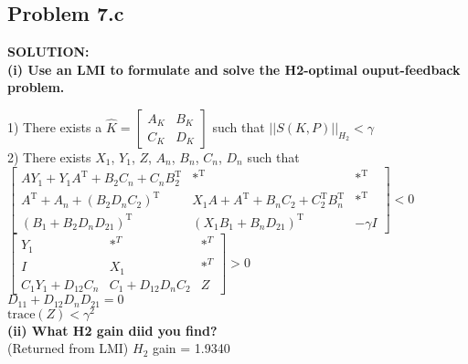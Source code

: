 \documentclass[10pt,a4paper]{article}
\begin{document}
\subsection{Problem 7.c}
\begin{tcolorbox}
\textbf{SOLUTION:}\\
\textbf{(i) Use an LMI to formulate and solve the H2-optimal ouput-feedback problem.} 

1) There exists a $\hat{K}=\begin{bmatrix} A_K & B_K \\ C_K & D_K \end{bmatrix}$ such that $||S(K,P)||_{H_2}<\gamma$\\

2) There exists $X_1$, $Y_1$, $Z$, $A_n$, $B_n$, $C_n$, $D_n$ such that\\

$\begin{bmatrix} 
AY_{1}+Y_{1}A^{\text{T}}+B_{2}C_{n}+C_{n}B_{2}^{\text{T}}  & *^{\text{T}} & *^{\text{T}} \\ 
A^{\text{T}}+A_{n}+(B_{2}D_{n}C_{2})^{\text{T}}  & X_{1}A+A^{\text{T}}+B_{n}C_{2}+C_{2}^{\text{T}}B_{n}^{\text{T}} & *^{\text{T}}\\ 
(B_{1}+B_{2}D_{n}D_{21})^{\text{T}} & (X_{1}B_{1} + B_{n}D_{21})^{\text{T}} & -\gamma I
\end{bmatrix} < 0$\\

$\begin{bmatrix} 
Y_{1}   & *^T & *^T \\ 
I  & X_{1} & *^T\\  
C_{1}Y_{1}+D_{12}C_{n} & C_{1}+D_{12}D_{n}C_{2} & Z
\end{bmatrix} > 0 $\\

$D_{11} + D_{12}D_{n}D_{21} = 0 $\\

$ \text{trace}(Z) < \gamma^{2} $\\

\textbf{(ii) What H2 gain diid you find?}\\ 
(Returned from LMI) $H_2$ gain =  1.9340

\end{tcolorbox}
\end{document}
